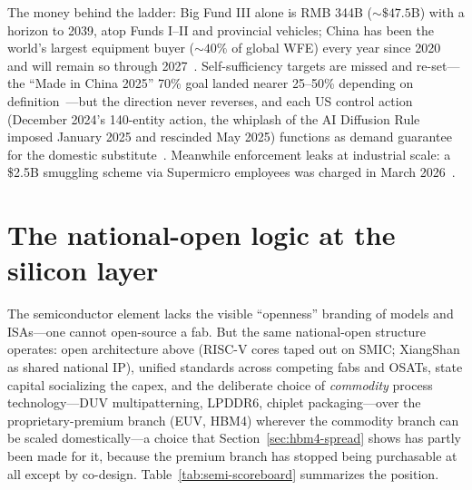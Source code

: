 The money behind the ladder: Big Fund III alone is RMB 344B (${\sim}\$47.5$B) with a horizon to 2039, atop Funds I--II and provincial vehicles; China has been the world's largest equipment buyer (${\sim}40\%$ of global WFE) every year since 2020 and will remain so through 2027~\cite{bigfund,semi-wfe}. Self-sufficiency targets are missed and re-set---the ``Made in China 2025'' 70\% goal landed nearer 25--50\% depending on definition~\cite{self-sufficiency}---but the direction never reverses, and each US control action (December 2024's 140-entity action, the whiplash of the AI Diffusion Rule imposed January 2025 and rescinded May 2025) functions as demand guarantee for the domestic substitute~\cite{bis-dec24,policy-whiplash}. Meanwhile enforcement leaks at industrial scale: a \$2.5B smuggling scheme via Supermicro employees was charged in March 2026~\cite{smuggling}.

\section{The national-open logic at the silicon layer}

The semiconductor element lacks the visible ``openness'' branding of models and ISAs---one cannot open-source a fab. But the same national-open structure operates: open architecture above (RISC-V cores taped out on SMIC; XiangShan as shared national IP), unified standards across competing fabs and OSATs, state capital socializing the capex, and the deliberate choice of \emph{commodity} process technology---DUV multipatterning, LPDDR6, chiplet packaging---over the proprietary-premium branch (EUV, HBM4) wherever the commodity branch can be scaled domestically---a choice that Section~\ref{sec:hbm4-spread} shows has partly been made for it, because the premium branch has stopped being purchasable at all except by co-design. Table~\ref{tab:semi-scoreboard} summarizes the position.

